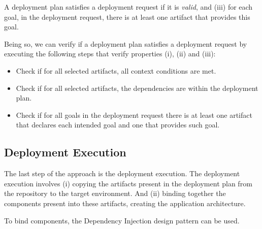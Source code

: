 A deployment plan satisfies a deployment request if it is \emph{valid}, and (iii) for each goal, in the deployment request, there is at least one artifact that provides this goal.

Being so, we can verify if a deployment plan satisfies a deployment request by executing the following steps that verify properties (i), (ii) and (iii):

\begin{itemize}
  \item Check if for all selected artifacts, all context conditions are met.
  \item Check if for all selected artifacts, the dependencies are within the deployment plan.
  \item Check if for all goals in the deployment request there is at least one artifact that declares each intended goal and one that provides such goal.
\end{itemize}

\subsection{Deployment Execution}

The last step of the approach is the deployment execution. The deployment execution involves (i) copying the artifacts present in the deployment plan from the repository to the target environment. And (ii) binding together the components present into these artifacts, creating the application architecture.

To bind components, the Dependency Injection\cite{fowler_inversion_2004} design pattern can be used.
